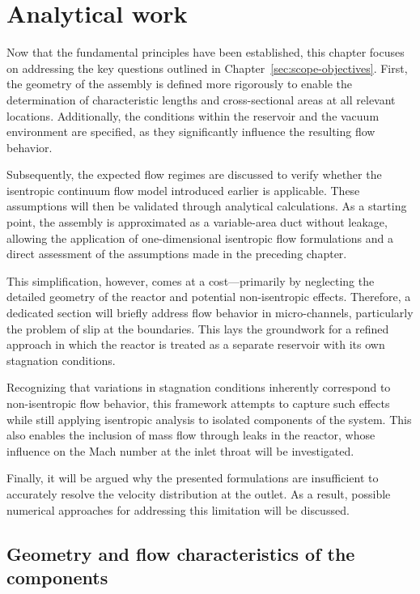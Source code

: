 
\section{Analytical work}
	Now that the fundamental principles have been established, this chapter focuses on addressing the key questions outlined in Chapter~\ref{sec:scope-objectives}.
	First, the geometry of the assembly is defined more rigorously to enable the determination of characteristic lengths and cross-sectional areas at all relevant locations.
	Additionally, the conditions within the reservoir and the vacuum environment are specified, as they significantly influence the resulting flow behavior.

	Subsequently, the expected flow regimes are discussed to verify whether the isentropic continuum flow model introduced earlier is applicable.
	These assumptions will then be validated through analytical calculations.
	As a starting point, the assembly is approximated as a variable-area duct without leakage, allowing the application of one-dimensional isentropic flow formulations and a direct assessment of the assumptions made in the preceding chapter.

	This simplification, however, comes at a cost—primarily by neglecting the detailed geometry of the reactor and potential non-isentropic effects.
	Therefore, a dedicated section will briefly address flow behavior in micro-channels, particularly the problem of slip at the boundaries.
	This lays the groundwork for a refined approach in which the reactor is treated as a separate reservoir with its own stagnation conditions.

	Recognizing that variations in stagnation conditions inherently correspond to non-isentropic flow behavior, this framework attempts to capture such effects while still applying isentropic analysis to isolated components of the system.
	This also enables the inclusion of mass flow through leaks in the reactor, whose influence on the Mach number at the inlet throat will be investigated.

	Finally, it will be argued why the presented formulations are insufficient to accurately resolve the velocity distribution at the outlet.
	As a result, possible numerical approaches for addressing this limitation will be discussed.

\subsection{Geometry and flow characteristics of the components}\label{sec:geometry}
	

